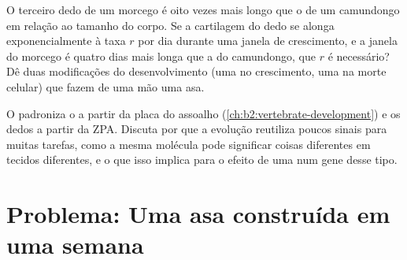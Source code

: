 \begin{exercise}[$\star\star\star$]\label{exo:b2:limb-organogenesis:11}
O terceiro dedo de um morcego é oito vezes mais longo que o de um
camundongo em relação ao tamanho do corpo. Se a cartilagem do dedo se
alonga exponencialmente à taxa $r$ por dia durante uma janela de
crescimento, e a janela do morcego é quatro dias mais longa que a do
camundongo, que $r$ é necessário? Dê duas modificações do
desenvolvimento (uma no crescimento, uma na morte celular) que fazem
de uma mão uma asa.
\end{exercise}

\begin{exercise}[$\star\star\star$]\label{exo:b2:limb-organogenesis:12}
O  padroniza o  a partir da placa do assoalho
(\cref{ch:b2:vertebrate-development}) e os dedos a partir da ZPA. Discuta por que a evolução
reutiliza poucos sinais para muitas tarefas, como a mesma molécula pode
significar coisas diferentes em tecidos diferentes, e o que isso
implica para o efeito de uma  num gene desse tipo.
\end{exercise}

\section{Problema: Uma asa construída em uma semana}

